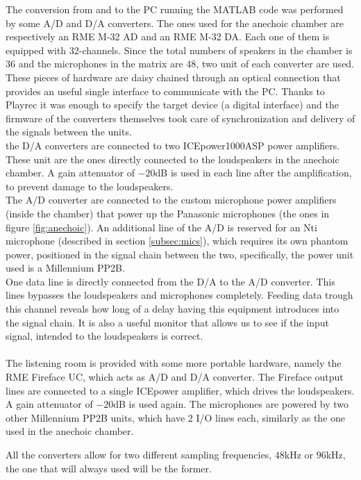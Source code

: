 The conversion from and to the PC running the MATLAB code was performed by some A/D and D/A converters. The ones used for the anechoic chamber are respectively an RME M-32 AD and an RME M-32 DA. Each one of them is equipped with 32-channels. Since the total numbers of speakers in the chamber is $36$ and the microphones in the matrix are $48$, two unit of each converter are used. These pieces of hardware are daisy chained through an optical connection that provides an useful single interface to communicate with the PC. Thanks to Playrec it was enough to specify the target device (a digital interface) and the firmware of the converters themselves took care of synchronization and delivery of the signals between the units.
\\
the D/A converters are connected to two ICEpower1000ASP power amplifiers. These unit are the ones directly connected to the loudspeakers in the anechoic chamber. A gain attenuator of $-20$dB is used in each line after the amplification, to prevent damage to the loudspeakers.
\\
The A/D converter are connected to the custom microphone power amplifiers (inside the chamber) that power up the Panasonic microphones (the ones in figure \ref{fig:anechoic}).
An additional line of the A/D is reserved for an Nti microphone (described in section \ref{subsec:mics}), which requires its own phantom power, positioned in the signal chain between the two, specifically, the power unit used is a Millennium PP2B.
\\
One data line is directly connected from the D/A to the A/D converter. This lines bypasses the loudspeakers and microphones completely. Feeding data trough this channel reveals how long of a delay having this equipment introduces into the signal chain. It is also a useful monitor that allows us to see if the input signal, intended to the loudspeakers is correct.
\\
\\
The listening room is provided with some more portable hardware, namely the RME Fireface UC, which acts as A/D and D/A converter. The Fireface output lines are connected to a single ICEpower amplifier, which drives the loudspeakers. A gain attenuator of $-20$dB is used again. The microphones are powered by two other Millennium PP2B units, which have 2 I/O lines each, similarly as the one used in the anechoic chamber.

All the converters allow for two different sampling frequencies, $48$kHz or $96$kHz, the one that will always used will be the former.

